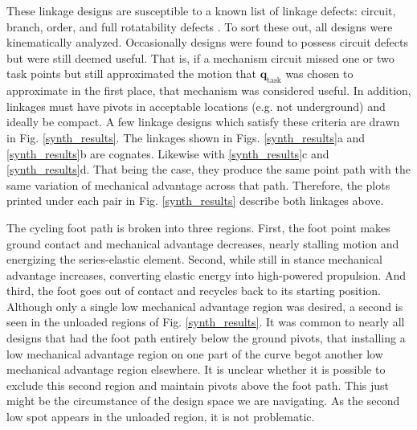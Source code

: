 \documentclass[journal]{IEEEtran}
\begin{document}
These linkage designs are susceptible to a known list of linkage defects: circuit, branch, order, and full rotatability defects \cite{balliDefectsLinkMechanisms2002}.
To sort these out, all designs were kinematically analyzed.
Occasionally designs were found to possess circuit defects but were still deemed useful.
That is, if a mechanism circuit missed one or two task points but still approximated the motion that $\mathbf{q}_\text{task}$ was chosen to approximate in the first place, that mechanism was considered useful.
In addition, linkages must have pivots in acceptable locations (e.g. not underground) and ideally be compact.
A few linkage designs which satisfy these criteria are drawn in Fig. \ref{synth_results}.
The linkages shown in Figs. \ref{synth_results}a and \ref{synth_results}b are cognates.  Likewise with \ref{synth_results}c and \ref{synth_results}d.
That being the case, they produce the same point path with the same variation of mechanical advantage across that path.
Therefore, the plots printed under each pair in Fig. \ref{synth_results} describe both linkages above.





The cycling foot path is broken into three regions.  
First, the foot point makes ground contact and mechanical advantage decreases, nearly stalling motion and energizing the series-elastic element.
Second, while still in stance mechanical advantage increases, converting elastic energy into high-powered propulsion.
And third, the foot goes out of contact and recycles back to its starting position.
Although only a single low mechanical advantage region was desired, a second is seen in the unloaded regions of Fig. \ref{synth_results}.
It was common to nearly all designs that had the foot path entirely below the ground pivots, that installing a low mechanical advantage region on one part of the curve begot another low mechanical advantage region elsewhere.
It is unclear whether it is possible to exclude this second region and maintain pivots above the foot path.
This just might be the circumstance of the design space we are navigating.
As the second low spot appears in the unloaded region, it is not problematic.
\end{document}
